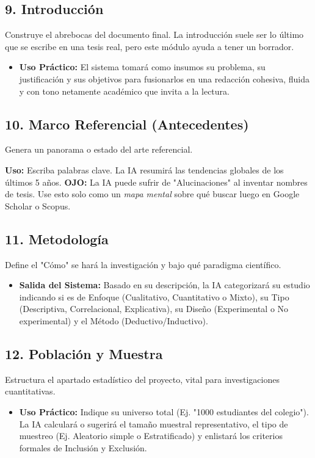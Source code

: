 \documentclass[12pt,a4paper]{article}
\begin{document}
\subsection{9. Introducción}
Construye el abrebocas del documento final. La introducción suele ser lo último que se escribe en una tesis real, pero este módulo ayuda a tener un borrador.
\begin{itemize}
    \item \textbf{Uso Práctico:} El sistema tomará como insumos su problema, su justificación y sus objetivos para fusionarlos en una redacción cohesiva, fluida y con tono netamente académico que invita a la lectura.
\end{itemize}

\subsection{10. Marco Referencial (Antecedentes)}
Genera un panorama o estado del arte referencial.
\begin{tcolorbox}[colback=lightgray, colframe=primary, title=Importante]
\textbf{Uso:} Escriba palabras clave. La IA resumirá las tendencias globales de los últimos 5 años. \textbf{OJO:} La IA puede sufrir de "Alucinaciones" al inventar nombres de tesis. Use esto solo como un \textit{mapa mental} sobre qué buscar luego en Google Scholar o Scopus.
\end{tcolorbox}

\subsection{11. Metodología}
Define el "Cómo" se hará la investigación y bajo qué paradigma científico.
\begin{itemize}
    \item \textbf{Salida del Sistema:} Basado en su descripción, la IA categorizará su estudio indicando si es de Enfoque (Cualitativo, Cuantitativo o Mixto), su Tipo (Descriptiva, Correlacional, Explicativa), su Diseño (Experimental o No experimental) y el Método (Deductivo/Inductivo).
\end{itemize}

\subsection{12. Población y Muestra}
Estructura el apartado estadístico del proyecto, vital para investigaciones cuantitativas.
\begin{itemize}
    \item \textbf{Uso Práctico:} Indique su universo total (Ej. "1000 estudiantes del colegio"). La IA calculará o sugerirá el tamaño muestral representativo, el tipo de muestreo (Ej. Aleatorio simple o Estratificado) y enlistará los criterios formales de Inclusión y Exclusión.
\end{itemize}
\end{document}
